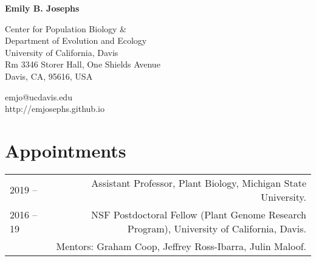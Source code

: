 \documentclass[letterpaper]{article}
\def\name{Emily B. Josephs}
\begin{document}
{\huge\textbf{\name}}
\vspace{0.1in}

\begin{minipage}{0.55\linewidth}
Center for Population Biology \& \\
Department of Evolution and Ecology\\
University of California, Davis \\
Rm 3346 Storer Hall, One Shields Avenue \\
Davis, CA, 95616, USA \\
\end{minipage}
\begin{minipage}{0.35\textwidth}
emjo@ucdavis.edu \\
http://emjosephs.github.io \\

\end{minipage}
\section*{Appointments}
\begin{tabular}{LR}
 2019 --   & Assistant Professor, Plant Biology, Michigan State University. \\[0.5ex]
  2016 -- 19     & NSF Postdoctoral Fellow (Plant Genome Research Program), University of California, Davis.\\
  & Mentors: Graham Coop, Jeffrey Ross-Ibarra, Julin Maloof.\\ [0.5ex]
\end{tabular}
\end{document}

